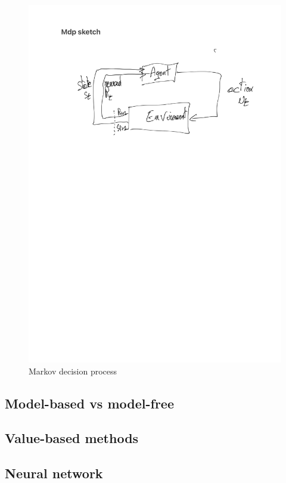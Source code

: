 \begin{figure}
    \centering
    \includegraphics{tex_thesis/figures/ch2/mdp_sketch.pdf}
    \caption{Markov decision process \citep{sutton2018reinforcement}}
    \label{fig:ch2_mdp}
\end{figure}

\subsection{Model-based vs model-free} \label{sec:ch2_model_based_vs_model_free}
\subsection{Value-based methods} \label{sec:ch2_value_based_methods}
\subsection{Neural network} \label{sec:ch2_neural_network}
